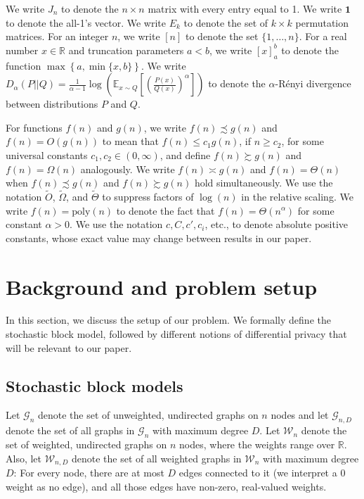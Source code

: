 \documentclass{article}
\newcommand{\real}{\mathbb{R}}
\begin{document}
We write $J_n$ to denote the $n \times n$ matrix with every entry equal to 1. We write $\textbf{1}$ to denote the all-1's vector. We write $E_k$ to denote the set of $k \times k$ permutation matrices.
For an integer $n$, we write $[n]$ to denote the set $\{1, \dots, n\}$.
For a real number $x \in \real$ and truncation parameters $a < b$, we write $[x]_a^b$ to denote the function $\max\left\{a, \min\{x, b\}\right\}$.
We write $D_\alpha(P||Q) = \frac{1}{\alpha - 1}\log\left(\mathbb{E}_{x \sim Q}\left[\left(\frac{P(x)}{Q(x)}\right)^\alpha\right]\right)$ to denote the $\alpha$-R\'{e}nyi divergence between distributions $P$ and $Q$.

For functions $f(n)$ and $g(n)$, we write $f(n) \precsim g(n)$ and $f(n) = O(g(n))$ to mean that $f(n) \le c_1g(n)$, if $n \geq c_2$, for some universal constants $c_1, c_2 \in (0, \infty)$, and define $f(n) \succsim g(n)$ and $f(n) = \Omega(n)$ analogously. We write $f(n) \asymp g(n)$ and $f(n) = \Theta(n)$ when $f(n) \precsim g(n)$ and $f(n) \succsim g(n)$ hold simultaneously. We use the notation $\widetilde{O}$, $\widetilde{\Omega}$, and $\widetilde{\Theta}$ to suppress factors of $\log(n)$ in the relative scaling. We write $f(n) = \mathrm{poly}(n)$ to denote the fact that $f(n) = \Theta(n^\alpha)$ for some constant $\alpha > 0$. We use the notation $c, C, c', c_i$, etc., to denote absolute positive constants, whose exact value may change between results in our paper.


\section{Background and problem setup}
\label{SecBackground}

In this section, we discuss the setup of our problem. We formally define the stochastic block model, followed by different notions of differential privacy that will be relevant to our paper.

\subsection{Stochastic block models}

Let $\mathcal{G}_n$ denote the set of unweighted, undirected graphs
on $n$ nodes and let $\mathcal{G}_{n, D}$ denote the set of all graphs in $\mathcal{G}_n$ with maximum degree $D$. 
Let $\mathcal{W}_n$ denote the set of weighted, undirected graphs on $n$ nodes, where the weights range over $\mathbb{R}$. Also, let $\mathcal{W}_{n, D}$ denote the set of all weighted graphs in $\mathcal{W}_n$ with maximum degree $D$: For every node, there are at most $D$ edges connected to it (we interpret a $0$ weight as no edge), and all those edges have non-zero, real-valued weights.
\end{document}
